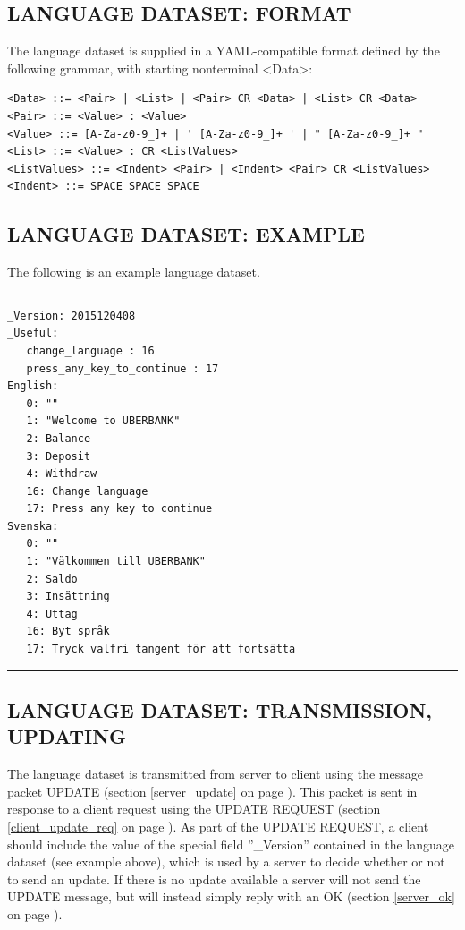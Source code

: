 \documentclass[a4paper,11pt]{article}
\begin{document}
\subsection{LANGUAGE DATASET: FORMAT}
\hfill\begin{minipage}{\dimexpr\textwidth-1.3cm}
The language dataset is supplied in a YAML-compatible format defined
by the following grammar, with starting nonterminal <Data>:

\begin{verbatim}
<Data> ::= <Pair> | <List> | <Pair> CR <Data> | <List> CR <Data>
<Pair> ::= <Value> : <Value>
<Value> ::= [A-Za-z0-9_]+ | ' [A-Za-z0-9_]+ ' | " [A-Za-z0-9_]+ "
<List> ::= <Value> : CR <ListValues>
<ListValues> ::= <Indent> <Pair> | <Indent> <Pair> CR <ListValues>
<Indent> ::= SPACE SPACE SPACE
\end{verbatim}
\end{minipage}
\vspace{0.5cm}

\subsection{LANGUAGE DATASET: EXAMPLE}
\label{lang_example}
\hfill\begin{minipage}{\dimexpr\textwidth-1.13cm}
The following is an example language dataset.

\rule{11cm}{0.7pt}
\begin{verbatim}
_Version: 2015120408
_Useful:
   change_language : 16
   press_any_key_to_continue : 17
English:
   0: ""
   1: "Welcome to UBERBANK"
   2: Balance
   3: Deposit
   4: Withdraw
   16: Change language
   17: Press any key to continue
Svenska:
   0: ""
   1: "Välkommen till UBERBANK"
   2: Saldo
   3: Insättning
   4: Uttag
   16: Byt språk
   17: Tryck valfri tangent för att fortsätta
\end{verbatim}
\rule{11cm}{0.7pt}
\end{minipage}
\vspace{0.5cm}

\subsection{LANGUAGE DATASET: TRANSMISSION, UPDATING}
\hfill\begin{minipage}{\dimexpr\textwidth-1.13cm}
The language dataset is transmitted from server to client using
the message packet UPDATE (section \ref{server_update} on page \pageref{server_update}).
This packet is sent in response to a client request using the
UPDATE REQUEST (section \ref{client_update_req} on page \pageref{client_update_req}).
As part of the UPDATE REQUEST, a client should include the value
of the special field ''\_Version'' contained in the language dataset
(see example above), which is used by a server
to decide whether or not to send an update. If there is no
update available a server will not send the UPDATE message, but
will instead simply reply with an OK (section \ref{server_ok} on
page \pageref{server_ok}).

\end{minipage}
\newpage
\end{document}
